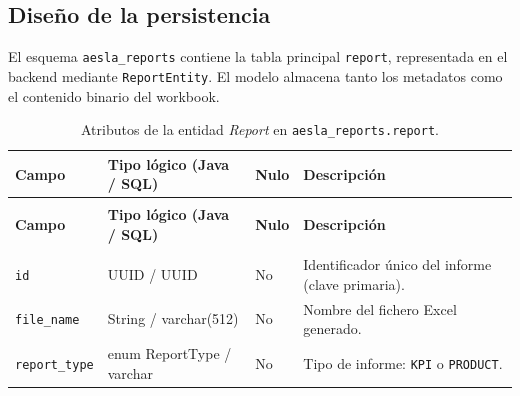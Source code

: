 \documentclass[11pt,a4paper,titlepage,oneside]{report}
\begin{document}
\subsection{Diseño de la persistencia}

El esquema \texttt{aesla\_reports} contiene la tabla principal
\texttt{report}, representada en el backend mediante \texttt{ReportEntity}.
El modelo almacena tanto los metadatos como el contenido binario del workbook.

\setlength{\tabcolsep}{4pt}
\renewcommand{\arraystretch}{1.20}

{\small
{}

\begin{longtable}{
  @{}
  >{\RaggedRight\arraybackslash}p{}
  >{\RaggedRight\arraybackslash}p{}
  >{\centering\arraybackslash}p{}
  >{\RaggedRight\arraybackslash}p{}
  @{}
}

\caption{Atributos de la entidad \textit{Report} en
\texttt{aesla\_reports.report}.}
\label{tab:modelo-informe-design}\\

\toprule
\rowcolor{udcpink!20}

\textbf{Campo} &
\textbf{Tipo lógico (Java / SQL)} &
\textbf{Nulo} &
\textbf{Descripción} \\

\midrule
\endfirsthead

\multicolumn{4}{r}{\small\itshape (continúa de la página anterior)}\\

\toprule
\rowcolor{udcpink!20}

\textbf{Campo} &
\textbf{Tipo lógico (Java / SQL)} &
\textbf{Nulo} &
\textbf{Descripción} \\

\midrule
\endhead

\midrule
\multicolumn{4}{r}{\small\itshape (continúa en la siguiente página)}\\
\endfoot

\bottomrule
\endlastfoot

\texttt{id} &
UUID / UUID &
No &
Identificador único del informe (clave primaria). \\

\texttt{file\_name} &
String / varchar(512) &
No &
Nombre del fichero Excel generado. \\

\texttt{report\_type} &
enum ReportType / varchar &
No &
Tipo de informe: \texttt{KPI} o \texttt{PRODUCT}. \\


\end{longtable}}
\end{document}
